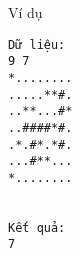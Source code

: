 Ví dụ  
\begin{verbatim}
Dữ liệu:
9 7
*........
.....**#.
..**...#*
..####*#.
.*.#*.*#.
...#**...
*........


Kết quả:
7


\end{verbatim}
